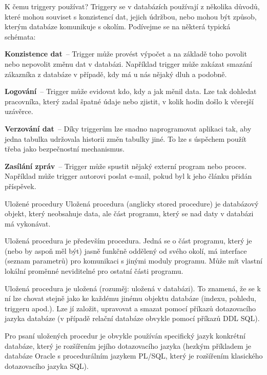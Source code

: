 \begin{obecne}{K čemu triggery používat?}
  Triggery se v databázích používají z několika důvodů, které mohou souviset s
  konzistencí dat, jejich údržbou, nebo mohou být způsob, kterým databáze
  komunikuje s okolím. Podívejme se na některá typická schémata:
  \begin{pitemize}
    \item \textbf{Konzistence dat}~-- Trigger může provést výpočet a na základě
    toho povolit nebo nepovolit změnu dat v databázi. Například trigger může zakázat
    smazání zákazníka z databáze v případě, kdy má u nás nějaký dluh a podobně.  
    \item \textbf{Logování}~-- Trigger může evidovat kdo, kdy a jak měnil data.
    Lze tak dohledat pracovníka, který zadal špatné údaje nebo zjistit, v kolik
    hodin došlo k včerejší uzávěrce.
    \item \textbf{Verzování dat}~-- Díky triggerům lze snadno naprogramovat
    aplikaci tak, aby jedna tabulka udržovala historii změn tabulky jiné. To lze
    s úspěchem použít třeba jako bezpečnostní mechanismus. 
    \item \textbf{Zasílání zpráv}~-- Trigger může spustit nějaký externí
    program nebo proces. Například může trigger autorovi poslat e-mail,
    pokud byl k jeho článku přidán příspěvek.
  \end{pitemize}
\end{obecne}

\begin{obecne}{Uložené procedury}
  Uložená procedura (anglicky stored procedure) je databázový objekt, který
  neobsahuje data, ale část programu, který se nad daty v databázi má vykonávat.

  Uložená procedura je především procedura. Jedná se o část programu, který je
  (nebo by aspoň měl být) jasně funkčně oddělený od svého okolí, má interface
  (seznam parametrů) pro komunikaci s jinými moduly programu. Může mít vlastní
  lokální proměnné neviditelné pro ostatní části programu. 

  Uložená procedura je uložená (rozuměj: uložená v databázi). To znamená, že se k
  ní lze chovat stejně jako ke každému jinému objektu databáze (indexu, pohledu,
  triggeru apod.). Lze jí založit, upravovat a smazat pomocí příkazů dotazovacího
  jazyka databáze (v případě relační databáze obvykle pomocí příkazů DDL SQL). 

  Pro psaní uložených procedur je obvykle používán specifický jazyk konkrétní
  databáze, který je rozšířením jejího dotazovacího jazyka (hezkým příkladem je
  databáze Oracle s procedurálním jazykem PL/SQL, který je rozšířením klasického
  dotazovacího jazyka SQL).
\end{obecne}

